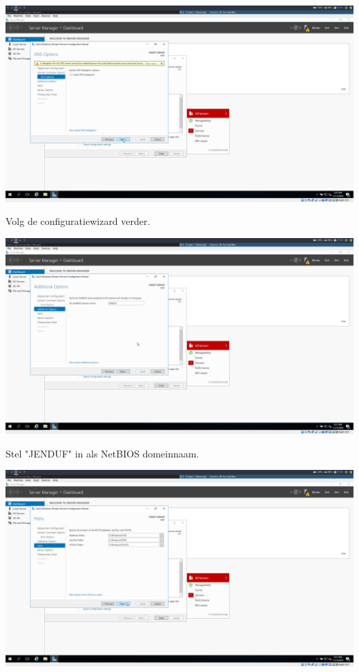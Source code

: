 \documentclass[a4paper]{article}
\begin{document}
\begin{center}
	\includegraphics[width=15cm]{Pictures/DC1/ADDS/1542298300.png}
	
	Volg de configuratiewizard verder.
\end{center}
\begin{center}
	\includegraphics[width=15cm]{Pictures/DC1/ADDS/1542298389.png}
	
	Stel "JENDUF" in als NetBIOS domeinnaam.
\end{center}
\begin{center}
	\includegraphics[width=15cm]{Pictures/DC1/ADDS/1542298414.png}
\end{center}
\end{document}
